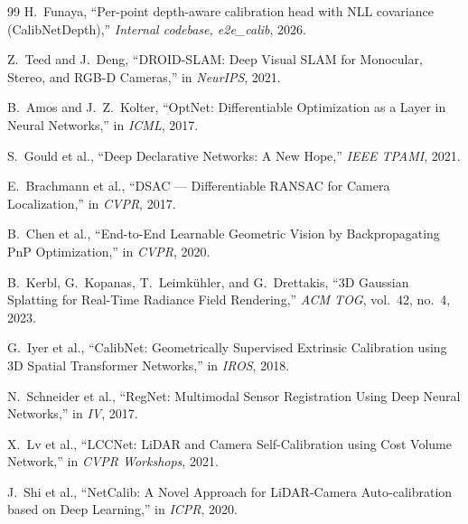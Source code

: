 \documentclass[10pt,conference,a4paper]{IEEEtran}
\begin{document}

\begin{thebibliography}{99}
H.\ Funaya, ``Per-point depth-aware calibration head with NLL
covariance (CalibNetDepth),''
\emph{Internal codebase, e2e\_calib}, 2026.

Z.\ Teed and J.\ Deng,
``DROID-SLAM: Deep Visual SLAM for Monocular, Stereo, and RGB-D
Cameras,''
in \emph{NeurIPS}, 2021.

B.\ Amos and J.\ Z.\ Kolter,
``OptNet: Differentiable Optimization as a Layer in Neural Networks,''
in \emph{ICML}, 2017.

S.\ Gould et al.,
``Deep Declarative Networks: A New Hope,''
\emph{IEEE TPAMI}, 2021.

E.\ Brachmann et al.,
``DSAC --- Differentiable RANSAC for Camera Localization,''
in \emph{CVPR}, 2017.

B.\ Chen et al.,
``End-to-End Learnable Geometric Vision by Backpropagating PnP
Optimization,''
in \emph{CVPR}, 2020.

B.\ Kerbl, G.\ Kopanas, T.\ Leimk\"uhler, and G.\ Drettakis,
``3D Gaussian Splatting for Real-Time Radiance Field Rendering,''
\emph{ACM TOG}, vol.\ 42, no.\ 4, 2023.

G.\ Iyer et al.,
``CalibNet: Geometrically Supervised Extrinsic Calibration using 3D
Spatial Transformer Networks,''
in \emph{IROS}, 2018.

N.\ Schneider et al.,
``RegNet: Multimodal Sensor Registration Using Deep Neural Networks,''
in \emph{IV}, 2017.

X.\ Lv et al.,
``LCCNet: LiDAR and Camera Self-Calibration using Cost Volume Network,''
in \emph{CVPR Workshops}, 2021.

J.\ Shi et al.,
``NetCalib: A Novel Approach for LiDAR-Camera Auto-calibration based
on Deep Learning,''
in \emph{ICPR}, 2020.

\end{thebibliography}
\end{document}
